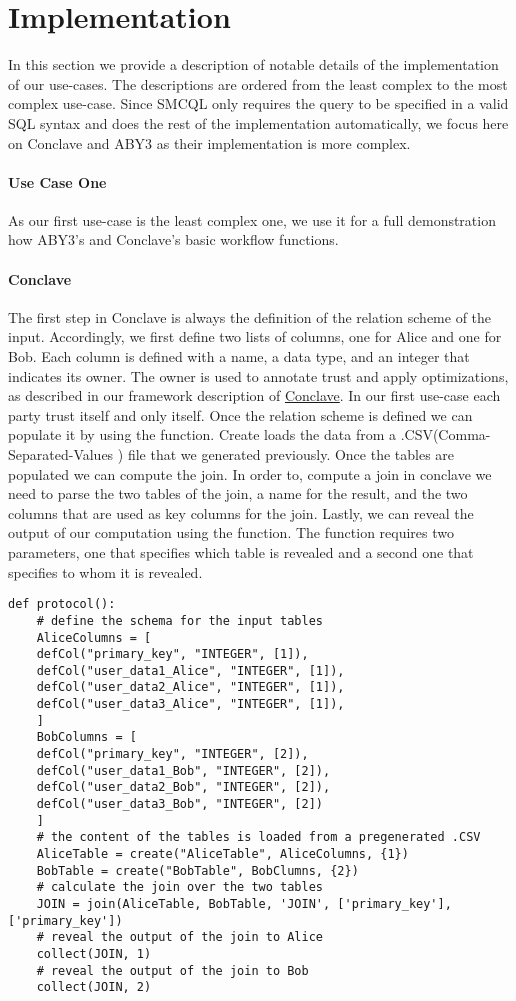 \section{Implementation}
\label{Implemetation}	
In this section we provide a description of notable details of the implementation of our use-cases. 
The descriptions are ordered from the least complex to the most complex use-case. Since SMCQL only requires the query to be specified in a valid SQL syntax and does the rest of the implementation automatically, we focus here on Conclave and ABY3 as their implementation is more complex.    
\paragraph{Use Case One}
As our first use-case is the least complex one, we use it for a full demonstration how ABY3's and Conclave's basic workflow functions. 
\paragraph{Conclave} 
The first step in Conclave is always the definition of the relation scheme of the input. Accordingly, we first define two lists of columns, one for Alice and one for Bob. Each column is defined with a name, a data type, and an integer that indicates its owner. The owner is used to annotate trust and apply optimizations, as described in our framework description of \hyperref[Trust_label]{Conclave}. In our first use-case each party trust itself and only itself. Once the relation scheme is defined we can populate it by using the  function. Create loads the data from a .CSV(Comma-Separated-Values ) file that we generated previously. Once the tables are populated we can compute the join. In order to, compute a join in conclave we need to parse the two tables of the join, a name for the result, and the two columns that are used as key columns for the join. 
Lastly, we can reveal the output of our computation using the  function. The  function requires two parameters, one that specifies which table is revealed and a second one that specifies to whom it is revealed.
\begin{lstlisting}[caption={ The Python protocol of Conclave for our first use-case    }]
def protocol():
	# define the schema for the input tables 
	AliceColumns = [
	defCol("primary_key", "INTEGER", [1]),
	defCol("user_data1_Alice", "INTEGER", [1]),
	defCol("user_data2_Alice", "INTEGER", [1]),
	defCol("user_data3_Alice", "INTEGER", [1]),
	]
	BobColumns = [
	defCol("primary_key", "INTEGER", [2]),
	defCol("user_data1_Bob", "INTEGER", [2]),
	defCol("user_data2_Bob", "INTEGER", [2]),
	defCol("user_data3_Bob", "INTEGER", [2])
	]
	# the content of the tables is loaded from a pregenerated .CSV
	AliceTable = create("AliceTable", AliceColumns, {1})
	BobTable = create("BobTable", BobClumns, {2})
	# calculate the join over the two tables 
	JOIN = join(AliceTable, BobTable, 'JOIN', ['primary_key'], ['primary_key'])
	# reveal the output of the join to Alice
	collect(JOIN, 1)
	# reveal the output of the join to Bob
	collect(JOIN, 2)
\end{lstlisting}

